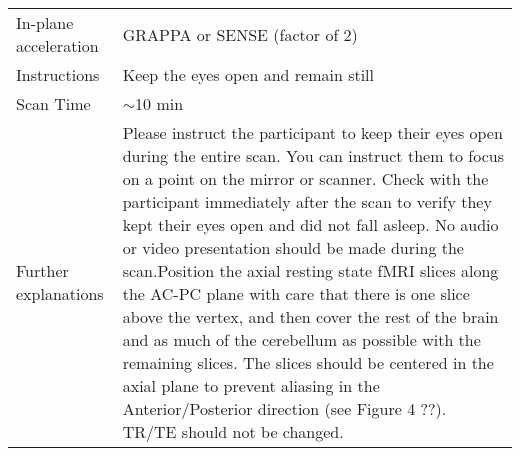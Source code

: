 \begin{table}[H]
\begin{tabularx}{\linewidth}{@{} s | X @{}}
In-plane acceleration                             				& GRAPPA or SENSE (factor of 2) \\
Instructions                                      					& Keep the eyes open and remain still \\
Scan Time                                         					& $\sim$10 min \\
Further explanations                              				& Please instruct the participant to keep their eyes open during the entire scan. You can instruct them to focus on a point on the mirror or scanner. Check with the participant immediately after the scan to verify they kept their eyes open and did not fall asleep. No audio or video presentation should be made during the scan.Position the axial resting state fMRI slices along the AC-PC plane with care that there is one slice above the vertex, and then cover the rest of the brain and as much of the cerebellum as possible with the remaining slices. The slices should be centered in the axial plane to prevent aliasing in the Anterior/Posterior direction (see Figure 4 ??). \ac{TR}/\ac{TE} should not be changed. \\
\bottomrule
\end{tabularx}
\end{table}

